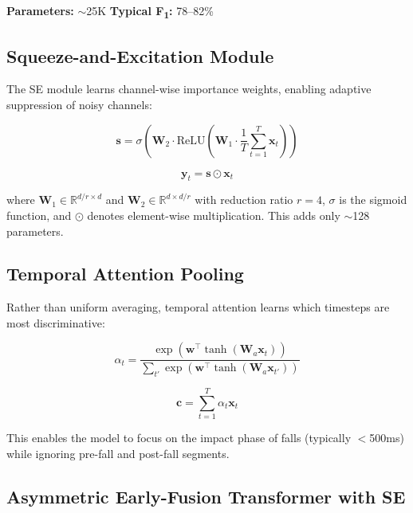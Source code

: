 \documentclass[journal,12pt]{IEEEtran}
\newcommand{\fone}{F\textsubscript{1}}
\begin{document}
\textbf{Parameters:} $\sim$25K \quad \textbf{Typical \fone{}:} 78--82\%

\subsection{Squeeze-and-Excitation Module}
\label{sec:se}

The SE module learns channel-wise importance weights, enabling adaptive suppression of noisy channels:

\begin{equation}
\label{eq:se}
\mathbf{s} = \sigma\left(\mathbf{W}_2 \cdot \text{ReLU}\left(\mathbf{W}_1 \cdot \frac{1}{T}\sum_{t=1}^{T} \mathbf{x}_t\right)\right)
\end{equation}

\begin{equation}
\label{eq:se_apply}
\mathbf{y}_t = \mathbf{s} \odot \mathbf{x}_t
\end{equation}

\noindent where $\mathbf{W}_1 \in \mathbb{R}^{d/r \times d}$ and $\mathbf{W}_2 \in \mathbb{R}^{d \times d/r}$ with reduction ratio $r=4$, $\sigma$ is the sigmoid function, and $\odot$ denotes element-wise multiplication. This adds only $\sim$128 parameters.

\subsection{Temporal Attention Pooling}
\label{sec:tap}

Rather than uniform averaging, temporal attention learns which timesteps are most discriminative:

\begin{equation}
\label{eq:tap_alpha}
\alpha_t = \frac{\exp(\mathbf{w}^\top \tanh(\mathbf{W}_a \mathbf{x}_t))}{\sum_{t'} \exp(\mathbf{w}^\top \tanh(\mathbf{W}_a \mathbf{x}_{t'}))}
\end{equation}

\begin{equation}
\label{eq:tap_context}
\mathbf{c} = \sum_{t=1}^{T} \alpha_t \mathbf{x}_t
\end{equation}

\noindent This enables the model to focus on the impact phase of falls (typically $<$500ms) while ignoring pre-fall and post-fall segments.

\subsection{Asymmetric Early-Fusion Transformer with SE}
\label{sec:asymmetric}
\end{document}
